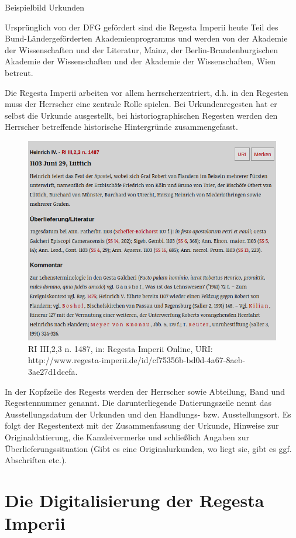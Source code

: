 \documentclass[ngerman,]{scrreprt}
\begin{document}
Beispielbild Urkunden

Ursprünglich von der DFG gefördert sind die Regesta Imperii heute Teil des Bund-Ländergeförderten Akademienprogramms und werden von der Akademie der Wissenschaften und der Literatur, Mainz, der Berlin-Brandenburgischen Akademie der Wissenschaften und der Akademie der Wissenschaften, Wien betreut.

Die Regesta Imperii arbeiten vor allem herrscherzentriert, d.h. in den Regesten muss der Herrscher eine zentrale Rolle spielen. Bei Urkundenregesten hat er selbst die Urkunde ausgestellt, bei historiographischen Regesten werden den Herrscher betreffende historische Hintergründe zusammengefasst.

\begin{figure}
\centering
\includegraphics{Bilder/RI2Graph/ReggH4-Nr-1487.png}
\caption{RI III,2,3 n. 1487, in: Regesta Imperii Online, URI: http://www.regesta-imperii.de/id/cf75356b-bd0d-4a67-8aeb-3ae27d1dcefa.}
\end{figure}

In der Kopfzeile des Regests werden der Herrscher sowie Abteilung, Band und Regestennummer genannt. Die darunterliegende Datierungszeile nennt das Ausstellungsdatum der Urkunden und den Handlungs- bzw. Ausstellungsort. Es folgt der Regestentext mit der Zusammenfassung der Urkunde, Hinweise zur Originaldatierung, die Kanzleivermerke und schließlich Angaben zur Überlieferungssituation (Gibt es eine Originalurkunden, wo liegt sie, gibt es ggf. Abschriften etc.).

\section{Die Digitalisierung der Regesta Imperii}\label{die-digitalisierung-der-regesta-imperii}
\end{document}
